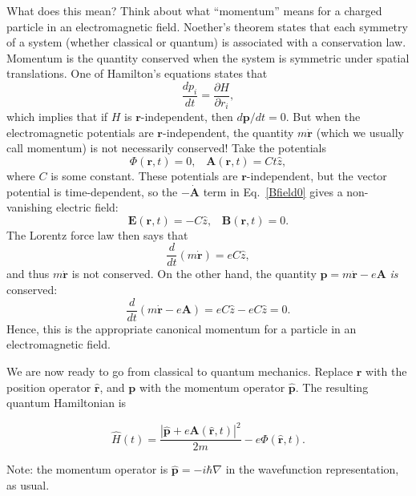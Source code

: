 \documentclass[prx,12pt]{revtex4-2}
\begin{document}
What does this mean?  Think about what ``momentum'' means for a
charged particle in an electromagnetic field.  Noether's theorem
states that each symmetry of a system (whether classical or quantum)
is associated with a conservation law.  Momentum is the quantity
conserved when the system is symmetric under spatial translations.
One of Hamilton's equations states that
\begin{equation*}
  \frac{dp_i}{dt} = \frac{\partial H}{\partial r_i},
\end{equation*}
which implies that if $H$ is $\mathbf{r}$-independent, then
$d\mathbf{p}/dt = 0$.  But when the electromagnetic potentials are
$\mathbf{r}$-independent, the quantity $m\dot{\mathbf{r}}$ (which we
usually call momentum) is not necessarily conserved!  Take the
potentials
\begin{equation}
  \Phi(\mathbf{r}, t) = 0, \;\;\; \mathbf{A}(\mathbf{r}, t) = Ct \hat{z},
\end{equation}
where $C$ is some constant.  These potentials are
$\mathbf{r}$-independent, but the vector potential is time-dependent,
so the $-\dot{\mathbf{A}}$ term in Eq.~\eqref{Bfield0} gives a
non-vanishing electric field:
\begin{equation}
  \mathbf{E}(\mathbf{r},t) = - C\hat{z}, \;\;\;\mathbf{B}(\mathbf{r},t) = 0.
\end{equation}
The Lorentz force law then says that
\begin{equation}
  \frac{d}{dt}(m\dot{\mathbf{r}}) = eC\hat{z},
\end{equation}
and thus $m\dot{\mathbf{r}}$ is not conserved.  On the other hand, the
quantity $\mathbf{p} = m\dot{\mathbf{r}} - e \mathbf{A}$ \textit{is}
conserved:
\begin{equation}
  \frac{d}{dt}(m\dot{\mathbf{r}} - e\mathbf{A}) =
  eC\hat{z} - eC\hat{z} = 0.
\end{equation}
Hence, this is the appropriate canonical momentum for a particle in an
electromagnetic field.

We are now ready to go from classical to quantum mechanics.  Replace
$\mathbf{r}$ with the position operator $\hat{\mathbf{r}}$, and
$\mathbf{p}$ with the momentum operator $\hat{\mathbf{p}}$.  The
resulting quantum Hamiltonian is
\begin{framed}
  \begin{equation}
    \hat{H}(t) = \frac{|\hat{\mathbf{p}}+e\mathbf{A}(\hat{\mathbf{r}},t)|^2}{2m}
    - e\Phi(\hat{\mathbf{r}},t).
    \label{quantumH}
  \end{equation}
\end{framed}
\vskip -0.15in
\noindent
Note: the momentum operator is $\hat{\mathbf{p}} = -i\hbar\nabla$
in the wavefunction representation, as usual.
\end{document}
